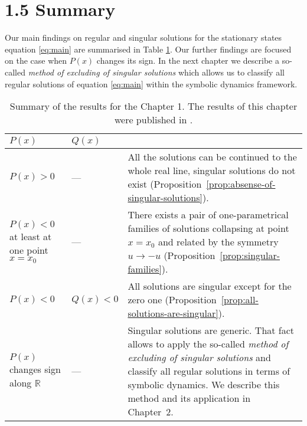 \section*{1.5 Summary}

Our main findings on regular and singular solutions for the stationary states equation \eqref{eq:main} are summarised in Table \ref{tab:first-chapter-results}.
Our further findings are focused on the case when $P(x)$ changes its sign.
In the next chapter we describe a so-called {\it method of excluding of singular solutions} which allows us to classify all regular solutions of equation \eqref{eq:main} within the symbolic dynamics framework.

\begin{table}[h!]
	\centering
	\begin{tabular}{ | p{4cm} | l || p{10cm} | }
		\hline
		$P(x)$ & $Q(x)$ & \\
		\hline
		$P(x) > 0$ & --- & All the solutions can be continued to the whole real line, singular solutions do not exist (Proposition~\ref{prop:absense-of-singular-solutions}). \\
		\hline
		$P(x) < 0$ at least at one point $x = x_0$ & --- & There exists a pair of one-parametrical families of solutions collapsing at point $x = x_0$ and related by the symmetry $u \to -u$ (Proposition~\ref{prop:singular-families}). \\
		\hline
		$P(x) < 0$ & $Q(x) < 0$ & All solutions are singular except for the zero one (Proposition~\ref{prop:all-solutions-are-singular}). \\
		\hline
		$P(x)$ changes sign along $\mathbb{R}$ & --- & Singular solutions are generic.
		That fact allows to apply the so-called {\it method of excluding of singular solutions} and classify all regular solutions in terms of symbolic dynamics.
		We describe this method and its application in Chapter~2. %
		 \\
		\hline
	\end{tabular}
	\caption{
		Summary of the results for the Chapter 1.
		The results of this chapter were published in \cite{AlfimovLebedev}.
	}
	\label{tab:first-chapter-results}
\end{table}
